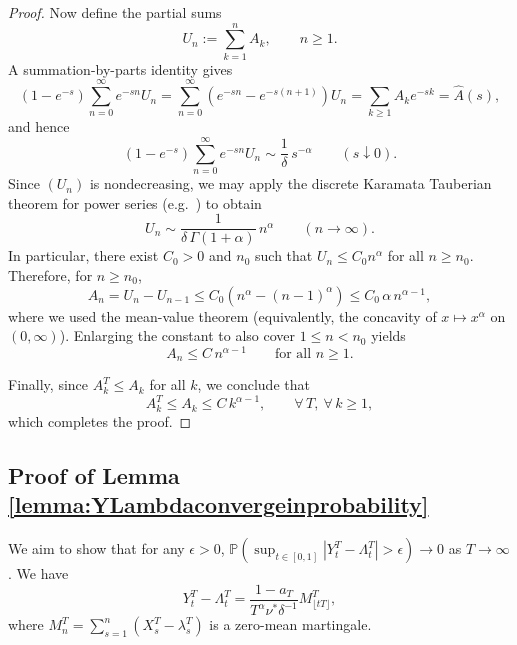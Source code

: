 \documentclass[letterpaper]{article}
\numberwithin{equation}{section}
\theoremstyle{definition}
\theoremstyle{remark}
\begin{document}
\begin{proof}
Now define the partial sums
\[
U_n:=\sum_{k=1}^n A_k,\qquad n\ge1.
\]
A summation-by-parts identity gives
\[
(1-e^{-s})\sum_{n=0}^\infty e^{-sn}U_n
=\sum_{n=0}^\infty (e^{-sn}-e^{-s(n+1)})U_n
=\sum_{k\ge1}A_k e^{-sk}
=\hat A(s),
\]
and hence
\[
(1-e^{-s})\sum_{n=0}^\infty e^{-sn}U_n
\sim \frac{1}{\delta}\,s^{-\alpha}\qquad(s\downarrow0).
\]
Since $(U_n)$ is nondecreasing, we may apply the discrete Karamata Tauberian theorem for power series
(e.g.\ \cite[Corollary~1.7.3]{bingham1989regular}) to obtain
\[
U_n \sim \frac{1}{\delta\,\Gamma(1+\alpha)}\,n^\alpha\qquad(n\to\infty).
\]
In particular, there exist $C_0>0$ and $n_0$ such that $U_n\le C_0 n^\alpha$ for all $n\ge n_0$.
Therefore, for $n\ge n_0$,
\[
A_n = U_n-U_{n-1}\le C_0\left(n^\alpha-(n-1)^\alpha\right)
\le C_0\,\alpha\,n^{\alpha-1},
\]
where we used the mean-value theorem (equivalently, the concavity of $x\mapsto x^\alpha$ on $(0,\infty)$).
Enlarging the constant to also cover $1\le n<n_0$ yields
\[
A_n\le C\,n^{\alpha-1}\qquad\text{for all }n\ge1.
\]

Finally, since $A_k^T\le A_k$ for all $k$, we conclude that
\[
A_k^T\le A_k\le C\,k^{\alpha-1},\qquad \forall\,T,\ \forall\,k\ge1,
\]
which completes the proof.
\end{proof}




\subsection{Proof of Lemma \ref{lemma:YLambdaconvergeinprobability}}
\label{subsec:proofofYLambdaconvergeinprobability}
  We aim to show that for any $\epsilon > 0$, $\mathbb{P}(\sup_{t\in[0,1]} |Y_t^T - \Lambda_t^T| > \epsilon) \to 0$ as $T \to \infty$.
  We have
  \[
    Y_t^T-\Lambda_t^T = \frac{1-a_T}{T^\alpha \nu^*\delta^{-1}} M_{\lfloor tT \rfloor}^T,
  \]
  where $M_n^T = \sum_{s=1}^{n}(X_s^T-\lambda_s^T)$ is a zero-mean martingale.
  
\end{document}
